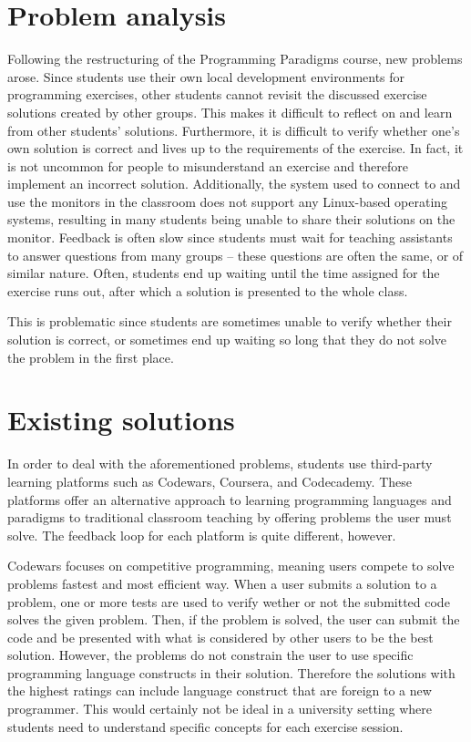\section{Problem analysis}
Following the restructuring of the Programming Paradigms course, new problems arose.
Since students use their own local development environments for programming exercises, other students cannot revisit the discussed exercise solutions created by other groups.
This makes it difficult to reflect on and learn from other students' solutions.
Furthermore, it is difficult to verify whether one's own solution is correct and lives up to the requirements of the exercise.
In fact, it is not uncommon for people to misunderstand an exercise and therefore implement an incorrect solution.
Additionally, the system used to connect to and use the monitors in the classroom does not support any Linux-based operating systems, resulting in many students being unable to share their solutions on the monitor.
Feedback is often slow since students must wait for teaching assistants to answer questions from many groups -- these questions are often the same, or of similar nature.
Often, students end up waiting until the time assigned for the exercise runs out, after which a solution is presented to the whole class.

This is problematic since students are sometimes unable to verify whether their solution is correct, or sometimes end up waiting so long that they do not solve the problem in the first place.

\section{Existing solutions}
In order to deal with the aforementioned problems, students use third-party learning platforms such as Codewars\cite{Codewars}, Coursera\cite{Coursera}, and Codecademy\cite{Codecademy}.
These platforms offer an alternative approach to learning programming languages and paradigms to traditional classroom teaching by offering problems the user must solve.
The feedback loop for each platform is quite different, however.


Codewars focuses on competitive programming, meaning users compete to solve problems fastest and most efficient way.
When a user submits a solution to a problem, one or more tests are used to verify wether or not the submitted code solves the given problem. Then, if the problem is solved, the user can submit the code and be presented with what is considered by other users to be the best solution. 
However, the problems do not constrain the user to use specific programming language constructs in their solution.
Therefore the solutions with the highest ratings can include language construct that are foreign to a new programmer. 
This would certainly not be ideal in a university setting where students need to understand specific concepts for each exercise session.


